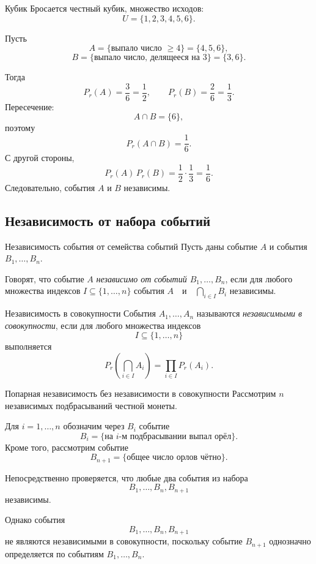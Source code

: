 \begin{Example}{Кубик}{}
	Бросается честный кубик, множество исходов:
	\[
	U=\{1,2,3,4,5,6\}.
	\]
	
	Пусть
	\[
	A=\{\text{выпало число } \ge 4\}=\{4,5,6\},
	\]
	\[
	B=\{\text{выпало число, делящееся на }3\}=\{3,6\}.
	\]
\end{Example}

	Тогда
	\[
	P_r(A)=\frac36=\frac12,
	\qquad
	P_r(B)=\frac26=\frac13.
	\]
	Пересечение:
	\[
	A\cap B=\{6\},
	\]
	поэтому
	\[
	P_r(A\cap B)=\frac16.
	\]
	С другой стороны,
	\[
	P_r(A)\,P_r(B)=\frac12\cdot\frac13=\frac16.
	\]
	Следовательно, события \(A\) и \(B\) независимы.


\subsection{Независимость от набора событий}

\begin{Definition}{Независимость события от семейства событий}{}
	Пусть даны событие \(A\) и события \(B_1,\dots,B_n\).
	
	Говорят, что событие \(A\) \textit{независимо от событий \(B_1,\dots,B_n\)}, если для любого множества индексов $I\subseteq \{1,\dots,n\}$ события $A \quad \text{и} \quad \bigcap_{i\in I} B_i$ независимы.
\end{Definition}

\begin{Definition}{Независимость в совокупности}{}
	События \(A_1,\dots,A_n\) называются \textit{независимыми в совокупности}, если для любого множества индексов
	\[
	I\subseteq \{1,\dots,n\}
	\]
	выполняется
	\[
	P_r\!\left(\bigcap_{i\in I} A_i\right)
	=
	\prod_{i\in I} P_r(A_i).
	\]
\end{Definition}

\begin{Example}{Попарная независимость без независимости в совокупности}{}
	Рассмотрим \(n\) независимых подбрасываний честной монеты.
	
	Для \(i=1,\dots,n\) обозначим через \(B_i\) событие
	\[
	B_i=\{\text{на \(i\)-м подбрасывании выпал орёл}\}.
	\]
	Кроме того, рассмотрим событие
	\[
	B_{n+1}=\{\text{общее число орлов чётно}\}.
	\]
	
	Непосредственно проверяется, что любые два события из набора
	\[
	B_1,\dots,B_n,B_{n+1}
	\]
	независимы.
	
	Однако события
	\[
	B_1,\dots,B_n,B_{n+1}
	\]
	не являются независимыми в совокупности, поскольку событие \(B_{n+1}\)
	однозначно определяется по событиям \(B_1,\dots,B_n\).
\end{Example}

